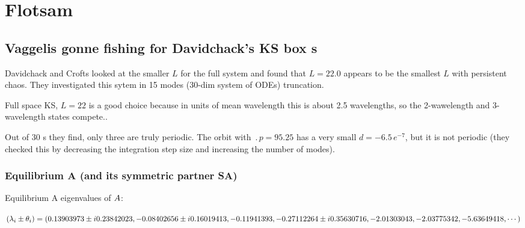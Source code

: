 %

\section{Flotsam}


\subsection{Vaggelis gonne fishing for Davidchack's KS box {\rpo s}}

Davidchack and Crofts looked at the smaller $L$ for the full system and found
that $L = 22.0$ appears to be the smallest $L$ with persistent chaos.  
They investigated this sytem in 15 modes (30-dim system of ODEs) truncation.

Full space KS, $L=22$ is a good choice because in units of mean wavelength
this is about 2.5 wavelengths, so the 2-wawelength and 3-wavelength states compete..

Out of 30 \rpo s they
find,  only three are truly periodic.  The orbit
with $\period{p} = 95.25$ has a very small $d = -6.5\,e^{-7}$, but it is not periodic 
(they
checked this by decreasing the integration step size and increasing the
number of modes).


\subsubsection{Equilibrium A (and its symmetric partner SA)}

Equilibrium A eigenvalues of ${A}$:

$(\lambda_i \pm \theta_i)
=(
  0.13903973 \pm i 0.23842023,
 -0.08402656 \pm i 0.16019413,
 -0.11941393, 
 -0.27112264 \pm i 0.35630716,
 -2.01303043,
 -2.03775342,
 -5.63649418,
\cdots
)$


